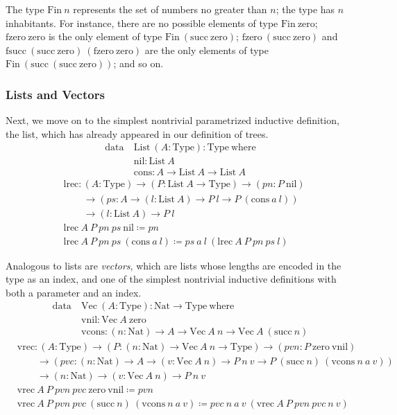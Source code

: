 \documentclass{report}
\newcommand{\Nat}{\const{Nat}}
\newcommand{\zero}{\const{zero}}
\renewcommand{\succ}{\const{succ}}
\newcommand{\List}{\const{List}}
\newcommand{\nil}{\const{nil}}
\newcommand{\cons}{\const{cons}}
\newcommand{\Fin}{\const{Fin}}
\newcommand{\fzero}{\const{fzero}}
\newcommand{\fsucc}{\const{fsucc}}
\newcommand{\Vector}{\const{Vec}}
\newcommand{\vnil}{\const{vnil}}
\newcommand{\vcons}{\const{vcons}}
\newcommand{\const}[1]{\text{#1}}
\newcommand{\data}{\const{data}}
\newcommand{\Type}{\const{Type}}
\newcommand{\where}{\const{where}}
\begin{document}
The type $\Fin ~ n$ represents the set of numbers no greater than $n$; the type has $n$ inhabitants. For instance, there are no possible elements of type $\Fin ~ \zero$; $\fzero ~ \zero$ is the only element of type $\Fin ~ (\succ ~ \zero)$; $\fzero ~ (\succ ~ \zero)$ and $\fsucc ~ (\succ ~ \zero) ~ (\fzero ~ \zero)$ are the only elements of type $\Fin ~ (\succ ~ (\succ ~ \zero))$; and so on.

\subsubsection{Lists and Vectors}

Next, we move on to the simplest nontrivial parametrized inductive definition, the list, which has already appeared in our definition of trees.
%
\begin{align*}
    \data ~ &\List ~ (A: \Type): \Type ~ \where \\
    &\nil: \List ~ A \\
    &\cons : A \to \List ~ A \to \List ~ A
\end{align*}
\begin{align*}
    &\const{lrec}: (A: \Type) \to (P: \List ~ A \to \Type) \to (pn: P ~ \nil) \\
    &\qquad\to (ps: A \to (l: \List ~ A) \to P ~ l \to P ~ (\cons ~ a ~ l)) \\
    &\qquad\to (l: \List ~ A) \to P ~ l \\
    &\const{lrec} ~ A ~ P ~ pn ~ ps ~ \nil \coloneqq pn \\
    &\const{lrec} ~ A ~ P ~ pn ~ ps ~ (\cons ~ a ~ l) \coloneqq ps ~ a ~ l ~ (\const{lrec} ~ A ~ P ~ pn ~ ps ~ l)
\end{align*}

Analogous to lists are \emph{vectors}, which are lists whose lengths are encoded in the type as an index, and one of the simplest nontrivial inductive definitions with both a parameter and an index.
%
\begin{align*}
    \data ~ &\Vector ~ (A: \Type): \Nat \to \Type ~ \where \\
    &\vnil: \Vector ~ A ~ \zero \\
    &\vcons: (n: \Nat) \to A \to \Vector ~ A ~ n \to \Vector ~ A ~ (\succ ~ n)
\end{align*}
\begin{align*}
    &\const{vrec}: (A: \Type) \to (P: (n: \Nat) \to \Vector ~ A ~ n \to \Type) \to (pvn: P ~ \zero ~ \vnil) \\
    &\qquad\to (pvc: (n: \Nat) \to A \to (v: \Vector ~ A ~ n) \to P ~ n ~ v \to P ~ (\succ ~ n) ~ (\vcons ~ n ~ a ~ v)) \\
    &\qquad\to (n: \Nat) \to (v: \Vector ~ A ~ n) \to P ~ n ~ v \\
    &\const{vrec} ~ A ~ P ~ pvn ~ pvc ~ \zero ~ \vnil \coloneqq pvn \\
    &\const{vrec} ~ A ~ P ~ pvn ~ pvc ~ (\succ ~ n) ~ (\vcons ~ n ~ a ~ v) \coloneqq pvc ~ n ~ a ~ v ~ (\const{vrec} ~ A ~ P ~ pvn ~ pvc ~ n ~ v)
\end{align*}
\end{document}
